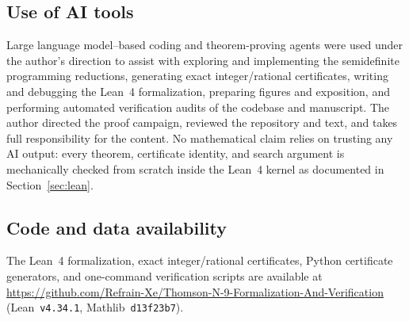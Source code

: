 \documentclass[11pt,reqno]{amsart}
\renewcommand{\_}{\origunderscore\allowbreak}
\theoremstyle{definition}
\begin{document}
\subsection*{Use of AI tools}
Large language model--based coding and theorem-proving agents were used under the author's direction to assist with exploring and implementing the semidefinite programming reductions, generating exact integer/rational certificates, writing and debugging the Lean~4 formalization, preparing figures and exposition, and performing automated verification audits of the codebase and manuscript. The author directed the proof campaign, reviewed the repository and text, and takes full responsibility for the content. No mathematical claim relies on trusting any AI output: every theorem, certificate identity, and search argument is mechanically checked from scratch inside the Lean~4 kernel as documented in Section~\ref{sec:lean}.

\subsection*{Code and data availability}
The Lean~4 formalization, exact integer/rational certificates, Python certificate generators, and one-command verification scripts are available at \url{https://github.com/Refrain-Xe/Thomson-N-9-Formalization-And-Verification} (Lean~\texttt{v4.34.1}, Mathlib~\texttt{d13f23b7}).
\end{document}
